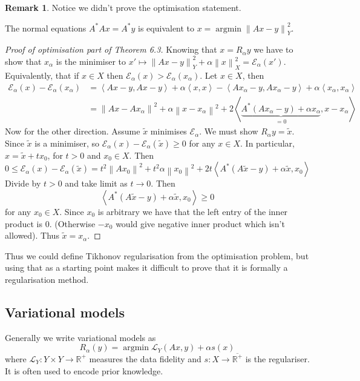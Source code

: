 \documentclass[12pt]{article}
\theoremstyle{definition}
\newtheorem*{remark}{Remark}
\newcommand{\real}{\mathbb{R}}   %
\DeclareMathOperator{\argmin}{argmin}
\newcommand\norm[1]{\left\lVert#1\right\rVert}
\newcommand\inner[2]{\left\langle#1, #2\right\rangle}
\begin{document}
\begin{remark}
    Notice we didn't prove the optimisation statement.
\end{remark}
The normal equations $A^*Ax=A^*y$ is equivalent to $x=\argmin \norm{Ax -y}_Y^2$. 
\begin{proof}[Proof of optimisation part of Theorem 6.3]
    Knowing that $x=R_\alpha y$ we have to show that $x_\alpha$ is the minimiser to $x'\mapsto \norm{Ax-y}^2_Y+\alpha\norm{x}^2_X=\mathcal{E}_\alpha(x')$. Equivalently, that if $x\in X$ then $\mathcal{E}_\alpha(x)>\mathcal{E}_\alpha(x_\alpha)$. Let $x\in X$, then 
    \begin{equation*}
        \begin{aligned}
            \mathcal{E}_\alpha(x) - \mathcal{E}_\alpha(x_\alpha) &= \inner{Ax-y}{Ax-y} + \alpha\inner{x}{x}-\inner{Ax_\alpha-y}{Ax_\alpha-y} + \alpha\inner{x_\alpha}{x_\alpha}\\
            &= \norm{Ax-Ax_\alpha}^2 + \alpha \norm{x-x_\alpha}^2 + 2\inner{\underbrace{A^*(Ax_\alpha -y) + \alpha x_\alpha}_{=0}}{x-x_\alpha}
        \end{aligned}
    \end{equation*}
    Now for the other direction. Assume $\tilde{x}$ minimises $\mathcal{E}_\alpha$. We must show $R_\alpha y = \tilde{x}$. Since $\tilde{x}$ is a minimiser, so $\mathcal{E}_\alpha(x)-\mathcal{E}_\alpha(\tilde{x})\geq0$ for any $x\in X$. In particular, $x= \tilde{x} + t x_0$, for $t>0$ and $x_0\in X$. Then
    \begin{equation*}
        0\leq \mathcal{E}_\alpha(x)-\mathcal{E}_\alpha(\tilde{x}) = t^2 \norm{Ax_0}^2 + t^2 \alpha \norm{x_0}^2 + 2t \inner{A^*(A\tilde{x}-y)+ \alpha \tilde{x}}{x_0}
    \end{equation*}
    Divide by $t>0$ and take limit as $t\to0$. Then
    \begin{equation*}
        \inner{A^*(A\tilde{x}-y)+ \alpha \tilde{x}}{x_0}\geq 0
    \end{equation*}
    for any $x_0\in X$. Since $x_0$ is arbitrary we have that the left entry of the inner product is 0. (Otherwise $-x_0$ would give negative inner product which isn't allowed). Thus $\tilde{x}=x_\alpha$. 
\end{proof}
Thus we could define Tikhonov regularisation from the optimisation problem, but using that as a starting point makes it difficult to prove that it is formally a regularisation method.

\subsection*{Variational models}
Generally we write variational models as 
\begin{equation*}
    R_\alpha(y) = \argmin \mathcal{L}_Y(Ax,y) + \alpha s(x)
\end{equation*}
where $\mathcal{L}_Y:Y\times Y\to \real^+$ measures the data fidelity and $s:X\to\overline{\real^+}$ is the regulariser. It is often used to encode prior knowledge.
\end{document}
